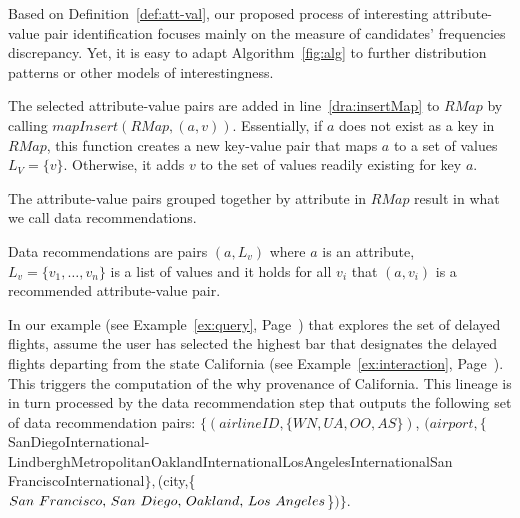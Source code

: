 Based on Definition~\ref{def:att-val}, our proposed process of interesting attribute-value pair identification focuses mainly on the measure of candidates' frequencies discrepancy. Yet, it is easy to adapt Algorithm~\ref{fig:alg} to further distribution patterns or other models of interestingness.


 The selected attribute-value pairs are added in line~\ref{dra:insertMap} to $RMap$ by calling $mapInsert(RMap, (a,v))$. Essentially, if $a$ does not exist as a key in $RMap$, this function creates a new key-value pair that maps $a$ to a set of values $L_V = \{v\}$. Otherwise, it adds $v$ to the set of values readily existing for key $a$. 





The attribute-value pairs grouped together by attribute in $RMap$ result in what we call data recommendations.

\begin{definition}
Data recommendations are pairs $(a, L_v)$ where $a$ is an attribute, $L_v = \{v_1, \ldots, v_n\}$ is a list of values and it holds for all $v_i$ that $(a, v_i)$ is a recommended attribute-value pair.
\end{definition}

 \begin{example}
 \label{ex:data-rec}
 \sloppy
In our example (see Example~\ref{ex:query}, Page~\pageref{ex:query}) that explores the set of delayed flights, assume the user has selected the highest bar that designates the delayed flights departing from the state California (see Example~\ref{ex:interaction}, Page~\pageref{ex:interaction}). This triggers the computation of the why provenance of California. 
This lineage is in turn processed by the data recommendation step that outputs the following set of data recommendation pairs: 
$\{(airlineID, \{WN,UA,OO,AS\})$,
$(airport,\{$San\text{ }Diego\text{ }International-Lindbergh\text{, }Metropolitan\text{ }Oakland\text{ }International\text{, }Los\text{ }Angeles\text{ }International\text{, }San \newline \text{ }Francisco\text{ }International$\},  $(city,\{$San\text{ }Francisco\text{, }San\text{ }Diego\text{, }Oakland\text{, } \newline Los\text{ }Angeles$\}$ )
\}$.
 \end{example}



